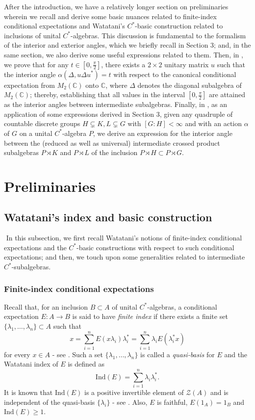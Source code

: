 \documentclass[a4]{amsart}
\numberwithin{equation}{section}
\newcommand{\C}{\mathbb{C}}
\begin{document}
After the introduction, we have a relatively longer section on
preliminaries wherein we recall and derive some basic nuances related
to finite-index conditional expectations and Watatani's $C^*$-basic
construction related to inclusions of unital $C^*$-algebras. This
discussion is fundamental to the formalism of the interior and
exterior angles, which we briefly recall in Section 3; and, in the same section, we also derive some
useful expressions related to them. Then, in
, we prove that for any $t \in
     [0,\frac{\pi}{2}]$, there exists a $2 \times 2$ unitary matrix
     $u$ such that the interior angle $\alpha(\Delta, u \Delta u^*) =
     t$ with respect to the canonical conditional expectation from
     $M_2(\C)$ onto $\C$, where $\Delta$ denotes the diagonal
     subalgebra of $M_2(\C)$; thereby, establishing that all values in
     the interval $[0, \frac{\pi}{2}]$ are attained as the interior
     angles between intermediate subalgebras. Finally, in
     , as an application of some expressions
     derived in Section 3, given any quadruple of countable discrete
     groups $H \subsetneq K, L \subsetneq G$ with $[G:H]< \infty$ and
     with an action $\alpha$ of $G$ on a unital $C^*$-algebra $P$, we
     derive  an expression for the interior angle between the (reduced as
     well as universal) intermediate crossed product subalgebras $P
     \rtimes K$ and $P \rtimes L$ of the inclusion $P \rtimes H
     \subset P \rtimes G$. 
\section{Preliminaries}

\subsection{Watatani's index and basic construction} \( \)
In this subsection, we first recall Watatani's notions of finite-index
conditional expectations and the $C^*$-basic constructions with
respect to such conditional expectations; and then, we touch upon some
generalities related to intermediate $C^*$-subalgebras.

\subsubsection{Finite-index conditional expectations}

Recall that, for an inclusion $B\subset A$ of unital $C^*$-algebras, a
conditional expectation $E: A\to B$ is said to have \textit{finite
  index} if there exists a finite set
$\{\lambda_1,\ldots,\lambda_n\}\subset A$ such that
\[
x=\sum_{i=1}^n E(x\lambda_i)\lambda^*_i=\sum_{i=1}^n
\lambda_iE(\lambda^*_ix)
\]
for every $x\in A$ - see \cite{Wat, Izumi, IW}. Such a set
$\{\lambda_1,\ldots,\lambda_n\}$ is called a \textit{quasi-basis} for
$E$ and the Watatani index of $E$ is defined as
 \[
 \mathrm{Ind} (E)= \sum_{i=1}^n \lambda_i\lambda^*_i.
 \]
It is known that $\mathrm{Ind}(E)$ is a positive invertible element of
$\mathcal{Z}(A)$ and is independent of the quasi-basis $\{\lambda_i\}$
- see \cite[$\S 2$]{Wat}. Also, $E$ is faithful, $E(1_A) = 1_B$ and
$\mathrm{Ind}(E)\geq 1$.
\end{document}
